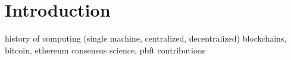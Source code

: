 \chapter{Introduction}

history of computing (single machine, centralized, decentralized)
blockchains, bitcoin, ethereum
consensus science, pbft
contributions
